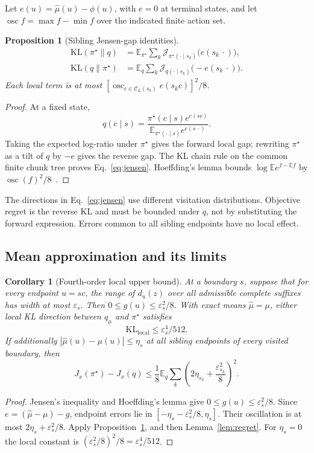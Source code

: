 \documentclass[pdflatex,sn-mathphys-num,review]{sn-jnl}
\theoremstyle{thmstyleone}
\newtheorem{proposition}[theorem]{Proposition}
\newtheorem{corollary}[theorem]{Corollary}
\theoremstyle{thmstyletwo}
\theoremstyle{thmstylethree}
\providecommand{\popt}{\pi^{\star}}
\providecommand{\E}{\mathbb{E}}
\providecommand{\KL}{\mathrm{KL}}
\providecommand{\osc}{\operatorname{osc}}
\providecommand{\Jg}{\mathcal{J}}
\providecommand{\Cset}{\mathcal{C}}
\providecommand{\muhat}{\widehat{\mu}}
\begin{document}
Let $e(u)=\muhat(u)-\phi(u)$, with $e=0$ at terminal states, and let $\osc f=\max f-\min f$ over the indicated finite action set.
\begin{proposition}[Sibling Jensen-gap identities]
\label{prop:jensen}
\begin{equation}
\begin{aligned}
\KL(\popt\|q)&=\E_{\popt}\sum_k\Jg_{\popt(\cdot\mid s_k)}\big(e(s_k\,\cdot)\big),\\
\KL(q\|\popt)&=\E_q\sum_k\Jg_{q(\cdot\mid s_k)}\big(-e(s_k\,\cdot)\big).
\end{aligned}
\label{eq:jensen}
\end{equation}
Each local term is at most $[\osc_{c\in\Cset_L(s_k)}e(s_kc)]^2/8$.
\end{proposition}
\begin{proof}
At a fixed state,
\[
q(c\mid s)=\frac{\popt(c\mid s)e^{e(sc)}}{\E_{\popt(\cdot\mid s)}e^{e(s\,\cdot)}}.
\]
Taking the expected log-ratio under $\popt$ gives the forward local gap; rewriting $\popt$ as a tilt of $q$ by $-e$ gives the reverse gap. The KL chain rule on the common finite chunk tree proves Eq.~\eqref{eq:jensen}. Hoeffding's lemma bounds $\log\E e^{f-\E f}$ by $\osc(f)^2/8$~\citep{hoeffding1963probability}.
\end{proof}

The directions in Eq.~\eqref{eq:jensen} use different visitation distributions. Objective regret is the reverse KL and must be bounded under $q$, not by substituting the forward expression. Errors common to all sibling endpoints have no local effect.

\subsection{Mean approximation and its limits}
\begin{corollary}[Fourth-order local upper bound]
\label{cor:fourth}
At a boundary $s$, suppose that for every endpoint $u=sc$, the range of $d_u(z)$ over all admissible complete suffixes has width at most $\varepsilon_s$. Then $0\le g(u)\le\varepsilon_s^2/8$. With exact means $\muhat=\mu$, either local KL direction between $q_\mu$ and $\popt$ satisfies
\begin{equation}
\KL_{\mathrm{local}}\le\varepsilon_s^4/512.
\label{eq:fourth}
\end{equation}
If additionally $|\muhat(u)-\mu(u)|\le\eta_s$ at all sibling endpoints of every visited boundary, then
\begin{equation}
J_x(\popt)-J_x(q)\le\frac18\E_q\sum_k
\left(2\eta_{s_k}+\frac{\varepsilon_{s_k}^2}{8}\right)^2.
\label{eq:regret-bound}
\end{equation}
\end{corollary}
\begin{proof}
Jensen's inequality and Hoeffding's lemma give $0\le g(u)\le\varepsilon_s^2/8$. Since $e=(\muhat-\mu)-g$, endpoint errors lie in $[-\eta_s-\varepsilon_s^2/8,\eta_s]$. Their oscillation is at most $2\eta_s+\varepsilon_s^2/8$. Apply Proposition~\ref{prop:jensen}, and then Lemma~\ref{lem:regret}. For $\eta_s=0$ the local constant is $(\varepsilon_s^2/8)^2/8=\varepsilon_s^4/512$.
\end{proof}
\end{document}
